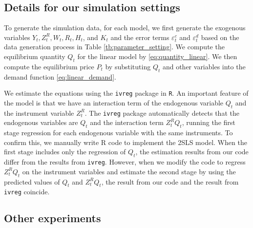 \documentclass[11pt, a4paper]{article}
\begin{document}
\subsection{Details for our simulation settings}

To generate the simulation data, for each model, we first generate the exogenous variables $Y_t, Z^{R}_{t}, W_t, R_{t}, H_t$, and $K_t$ and the error terms $\varepsilon_{t}^c$ and $\varepsilon_{t}^d$ based on the data generation process in Table \ref{tb:parameter_setting}.
We compute the equilibrium quantity $Q_{t}$ for the linear model by \eqref{eq:quantity_linear}.
We then compute the equilibrium price $P_t$ by substituting $Q_{t}$ and other variables into the demand function \eqref{eq:linear_demand}.

We estimate the equations using the \texttt{ivreg} package in \texttt{R}.
An important feature of the model is that we have an interaction term of the endogenous variable $Q_{t}$ and the instrument variable $Z^{R}_{t}$.
The \texttt{ivreg} package automatically detects that the endogenous variables are $Q_{t}$ and the interaction term $Z^{R}_{t}Q_{t}$, running the first stage regression for each endogenous variable with the same instruments. To confirm this, we manually write R code to implement the 2SLS model. 
When the first stage includes only the regression of $Q_{t}$, the estimation results from our code differ from the results from \texttt{ivreg}. 
However, when we modify the code to regress $Z^{R}_{t}Q_{t}$ on the instrument variables and estimate the second stage by using the predicted values of $Q_{t}$ and $Z^{R}_{t}Q_{t}$, the result from our code and the result from \texttt{ivreg} coincide.


\subsection{Other experiments}
\end{document}
